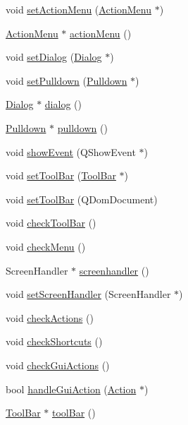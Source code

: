 \begin{DoxyCompactItemize}
\item 
void \hyperlink{classFglForm_acdc54b976403abededb061ba2dd0c30f}{setActionMenu} (\hyperlink{classActionMenu}{ActionMenu} $\ast$)
\item 
\hyperlink{classActionMenu}{ActionMenu} $\ast$ \hyperlink{classFglForm_aa7339ffc3aa81015c493104643fde6a1}{actionMenu} ()
\item 
void \hyperlink{classFglForm_aee2921f4bcb8f95e10fde25ec84842d3}{setDialog} (\hyperlink{classDialog}{Dialog} $\ast$)
\item 
void \hyperlink{classFglForm_a19892721571e2c56399ca6be07c3f750}{setPulldown} (\hyperlink{classPulldown}{Pulldown} $\ast$)
\item 
\hyperlink{classDialog}{Dialog} $\ast$ \hyperlink{classFglForm_ace102516f1523e1ea87c64f2db1ea30e}{dialog} ()
\item 
\hyperlink{classPulldown}{Pulldown} $\ast$ \hyperlink{classFglForm_a05f163612a936468e8fac3e84aeec02e}{pulldown} ()
\item 
void \hyperlink{classFglForm_a81b6a444e67df3a3e56ff786fe9099b7}{showEvent} (QShowEvent $\ast$)
\item 
void \hyperlink{classFglForm_acf0280c2e7ca7d56bc45c822b8fb9468}{setToolBar} (\hyperlink{classToolBar}{ToolBar} $\ast$)
\item 
void \hyperlink{classFglForm_ad139148f573546a3ef5ead0f49170d08}{setToolBar} (QDomDocument)
\item 
void \hyperlink{classFglForm_a7490e381d17c7644c7f37a58d5ffa9b4}{checkToolBar} ()
\item 
void \hyperlink{classFglForm_ab7d3ed99ee7eac4b6b781e576d33a1ea}{checkMenu} ()
\item 
ScreenHandler $\ast$ \hyperlink{classFglForm_aebb86e0bc590b730ff490b030b5dba7c}{screenhandler} ()
\item 
void \hyperlink{classFglForm_aba5859f32918808eb18606b85483a4c6}{setScreenHandler} (ScreenHandler $\ast$)
\item 
void \hyperlink{classFglForm_ad806af9cecf975dc4abe1e12eb52864a}{checkActions} ()
\item 
void \hyperlink{classFglForm_a3770f9b34c38cb5bc3f66a7e388c43ce}{checkShortcuts} ()
\item 
void \hyperlink{classFglForm_a60718980fe99888336db588976319382}{checkGuiActions} ()
\item 
bool \hyperlink{classFglForm_ab44742db0c6d0d2e0663db22c9668b4c}{handleGuiAction} (\hyperlink{classAction}{Action} $\ast$)
\item 
\hyperlink{classToolBar}{ToolBar} $\ast$ \hyperlink{classFglForm_ae474767d66111cda958e191e6be1e34d}{toolBar} ()

\end{DoxyCompactItemize}
